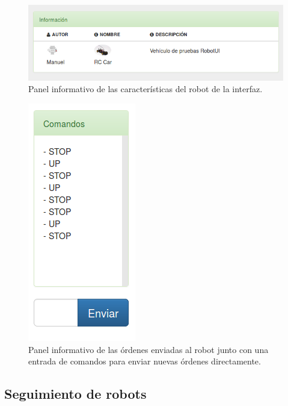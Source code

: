 \begin{figure}[H]
  \begin{center}
    \includegraphics[scale=.6]{imagenes/manual-usuario/panel-robot-info.png}
  \end{center}
  \caption{ Panel informativo de las características del robot de la interfaz.}
  \label{website:pagina-principal}
\end{figure}


\begin{figure}[H]
  \begin{center}
    \includegraphics[scale=.6]{imagenes/manual-usuario/panel-comandos.png}
  \end{center}
  \caption{ Panel informativo de las órdenes enviadas al robot junto con una entrada de comandos para enviar nuevas órdenes directamente.}
  \label{website:pagina-principal}
\end{figure}


\subsection{ Seguimiento de robots }
\label{sec:visita-robot}

